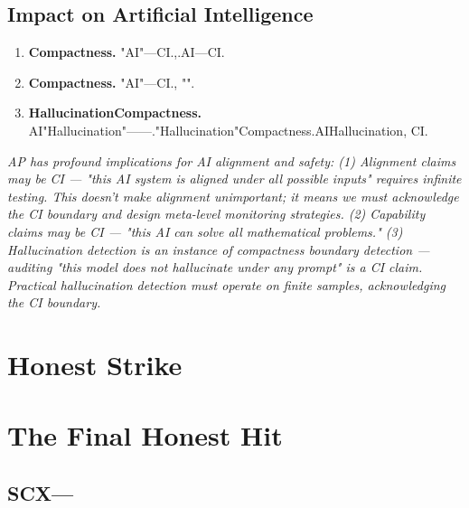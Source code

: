 \documentclass[12pt,a4paper]{article}
\theoremstyle{plain}
\theoremstyle{definition}
\theoremstyle{remark}
\begin{document}
\subsection{}
\subsection{Impact on Artificial Intelligence}
\begin{enumerate}[label=(\arabic*)]
 \item \textbf{Compactness.} "AI"---CI.,.AI---CI.
 \item \textbf{Compactness.} "AI"---CI., "".
 \item \textbf{HallucinationCompactness.} AI"Hallucination"------."Hallucination"Compactness.AIHallucination, CI.
\end{enumerate}
\vspace{4pt}
\noindent
\textit{AP has profound implications for AI alignment and safety: (1) Alignment claims may be CI --- "this AI system is aligned under all possible inputs" requires infinite testing. This doesn't make alignment unimportant; it means we must acknowledge the CI boundary and design meta-level monitoring strategies. (2) Capability claims may be CI --- "this AI can solve all mathematical problems." (3) Hallucination detection is an instance of compactness boundary detection --- auditing "this model does not hallucinate under any prompt" is a CI claim. Practical hallucination detection must operate on finite samples, acknowledging the CI boundary.}
\newpage
\section{Honest Strike}
\section{The Final Honest Hit}
\subsection{SCX---}
\end{document}
